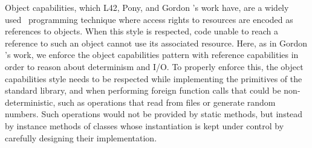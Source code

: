 % 





\label{s:OCs}
Object capabilities, which L42, Pony, and Gordon \etal's work have, are a widely used~\cite{miller2003capability,noble2016abstract,karger1988improving,RobustComposition} programming technique where access rights to resources are encoded as references to objects. When this style
is respected, 
code 
unable to reach a reference
 to such an object cannot use its associated resource.
Here, as in Gordon \etal's work, we enforce the object capabilities pattern with reference capabilities in order to reason about determinism and I/O. To properly enforce this, the object capabilities style needs to be respected while implementing the primitives of the standard library, and when performing foreign function calls that could be non-deterministic, such as operations that read from files or generate random numbers. Such operations would not be provided by static methods, but instead by instance methods of classes whose instantiation is kept under control
by carefully designing their implementation. 



